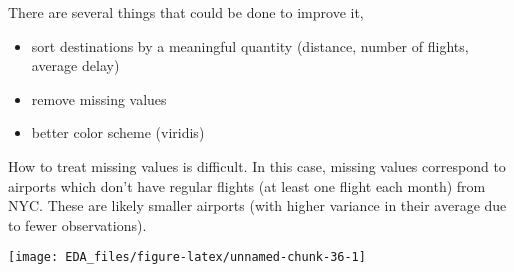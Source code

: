 \documentclass[]{book}
\newenvironment{Shaded}{\begin{snugshade}}{\end{snugshade}}
\newcommand{\DataTypeTok}[1]{\textcolor[rgb]{0.13,0.29,0.53}{#1}}
\newcommand{\DecValTok}[1]{\textcolor[rgb]{0.00,0.00,0.81}{#1}}
\newcommand{\KeywordTok}[1]{\textcolor[rgb]{0.13,0.29,0.53}{\textbf{#1}}}
\newcommand{\NormalTok}[1]{#1}
\newcommand{\OperatorTok}[1]{\textcolor[rgb]{0.81,0.36,0.00}{\textbf{#1}}}
\newcommand{\OtherTok}[1]{\textcolor[rgb]{0.56,0.35,0.01}{#1}}
\newcommand{\StringTok}[1]{\textcolor[rgb]{0.31,0.60,0.02}{#1}}
\providecommand{\tightlist}{%
  \setlength{\itemsep}{0pt}\setlength{\parskip}{0pt}}
\theoremstyle{plain}
\theoremstyle{remark}
\begin{document}
There are several things that could be done to improve it,

\begin{itemize}
\tightlist
\item
  sort destinations by a meaningful quantity (distance, number of
  flights, average delay)
\item
  remove missing values
\item
  better color scheme (viridis)
\end{itemize}

How to treat missing values is difficult. In this case, missing values
correspond to airports which don't have regular flights (at least one
flight each month) from NYC. These are likely smaller airports (with
higher variance in their average due to fewer observations).

\begin{Shaded}
\end{Shaded}

\begin{center}\texttt{[image: EDA\_files/figure-latex/unnamed-chunk-36-1]} \end{center}
\end{document}
